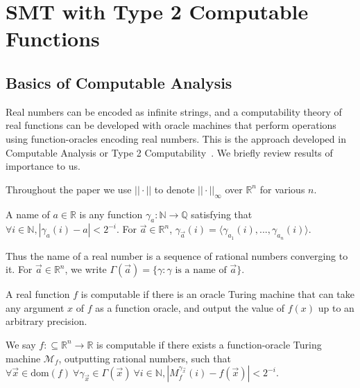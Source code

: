 \documentclass[prodmode]{acmsmall} %
\newcommand{\dom}{\mathrm{dom}}
\begin{document}
\section{SMT with Type 2 Computable Functions}\label{smt}
\subsection{Basics of Computable Analysis}

Real numbers can be encoded as infinite strings, and a computability theory of real functions can be developed with oracle machines that perform operations using function-oracles encoding real numbers. This is the approach developed in Computable Analysis or Type 2 Computability~\cite{CAbook,Kobook,vasco}. We briefly review results of importance to us.


Throughout the paper we use $||\cdot||$ to denote $||\cdot||_{\infty}$ over $\mathbb{R}^n$ for various $n$. 

\begin{definition}[Names]
A name of $a\in \mathbb{R}$ is any function $\mathcal{\gamma}_a: \mathbb{N}\rightarrow \mathbb{Q}$ satisfying that $\forall i\in \mathbb{N}, |\gamma_a(i) - a|<2^{-i}.$ For $\vec a\in \mathbb{R}^n$, $\gamma_{\vec a}(i) = \langle \gamma_{a_1}(i), ..., \gamma_{a_n}(i)\rangle$.  
\end{definition}
Thus the name of a real number is a sequence of rational numbers converging to it. For $\vec a\in \mathbb{R}^n$, we write $\Gamma(\vec a) = \{\gamma: \gamma\mbox{ is a name of }\vec a\}$. 

A real function $f$ is computable if there is an oracle Turing machine that can take any argument $x$ of $f$ as a function oracle, and output the value of $f(x)$ up to an arbitrary precision. 
\begin{definition}
We say $f:\subseteq\mathbb{R}^n\rightarrow \mathbb{R}$ is computable if there exists a function-oracle Turing machine $\mathcal{M}_f$, outputting rational numbers, such that $\forall \vec x \in \dom(f)\ \forall \gamma_{\vec x}\in \Gamma(\vec x)\ \forall i \in \mathbb{N}, |M_f^{\gamma_{\vec x}}(i) - f(\vec x)|<2^{-i}.$
\end{definition}
\end{document}
